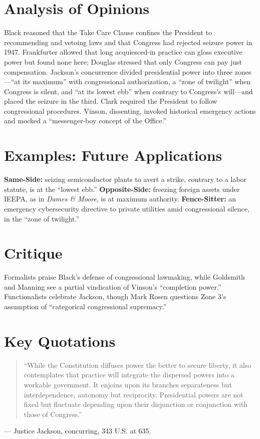 \documentclass[12pt]{article}
\begin{document}
\section{Analysis of Opinions}
Black reasoned that the Take Care Clause confines the President to recommending and vetoing laws and that Congress had rejected seizure power in 1947. Frankfurter allowed that long acquiesced-in practice can gloss executive power but found none here; Douglas stressed that only Congress can pay just compensation. Jackson's concurrence divided presidential power into three zones---``at its maximum'' with congressional authorization, a ``zone of twilight'' when Congress is silent, and ``at its lowest ebb'' when contrary to Congress's will---and placed the seizure in the third. Clark required the President to follow congressional procedures. Vinson, dissenting, invoked historical emergency actions and mocked a ``messenger-boy concept of the Office.''

\section{Examples: Future Applications}
\textbf{Same-Side:} seizing semiconductor plants to avert a strike, contrary to a labor statute, is at the ``lowest ebb.'' \textbf{Opposite-Side:} freezing foreign assets under IEEPA, as in \textit{Dames \& Moore}, is at maximum authority. \textbf{Fence-Sitter:} an emergency cybersecurity directive to private utilities amid congressional silence, in the ``zone of twilight.''

\section{Critique}
Formalists praise Black's defense of congressional lawmaking, while Goldsmith and Manning see a partial vindication of Vinson's ``completion power.'' Functionalists celebrate Jackson, though Mark Rosen questions Zone 3's assumption of ``categorical congressional supremacy.''

\section{Key Quotations}
\begin{quote}
``While the Constitution diffuses power the better to secure liberty, it also contemplates that practice will integrate the dispersed powers into a workable government. It enjoins upon its branches separateness but interdependence, autonomy but reciprocity. Presidential powers are not fixed but fluctuate depending upon their disjunction or conjunction with those of Congress.''
\end{quote}
\noindent --- Justice Jackson, concurring, 343 U.S. at 635.
\end{document}
